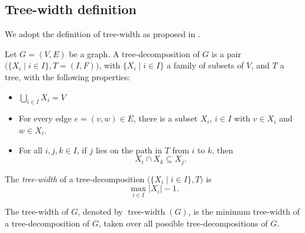 
\subsection{Tree-width definition}
We adopt the definition of tree-width as proposed in \cite{ClassOfGraphsBoundedTreewidth}.


Let $G = (V, E)$ be a graph. A tree-decomposition of $G$ is a pair 
$\bigl(\{X_i \mid i \in I\}, T = (I, F)\bigr)$, with 
$\{X_i \mid i \in I\}$ a family of subsets of $V$, and $T$ a tree, with the following properties:
\begin{itemize}
    \item $\bigcup_{i \in I} X_i = V$
    \item For every edge $e = (v, w) \in E$, there is a subset $X_i$, $i \in I$ with $v \in X_i$ and $w \in X_i$.
    \item For all $i, j, k \in I$, if $j$ lies on the path in $T$ from $i$ to $k$, then 
    \[
        X_i \cap X_k \subseteq X_j.
    \]
\end{itemize}

The \emph{tree-width} of a tree-decomposition $\bigl(\{X_i \mid i \in I\}, T\bigr)$ is 
\[
    \max_{i \in I} |X_i| - 1.
\]

The tree-width of $G$, denoted by $\operatorname{tree\text{-}width}(G)$, is the minimum tree-width 
of a tree-decomposition of $G$, taken over all possible tree-decompositions of $G$.
